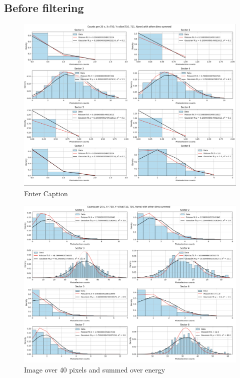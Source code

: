 \subsection{Before filtering}

\begin{figure}
    \centering
    \includegraphics[width=1\linewidth]{images/image.png}
    \caption{Enter Caption}
    \label{Image at one 2D pixel but summed over energy}
\end{figure}

\begin{figure}
    \centering
    \includegraphics[width=1\linewidth]{images/summed.png}
    \caption{Image over 40 pixels and summed over energy}
\end{figure}

